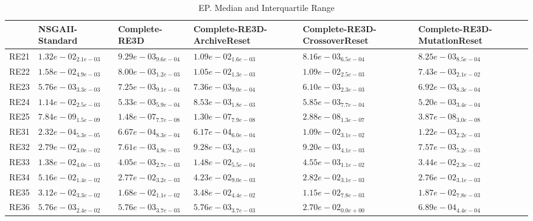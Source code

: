\documentclass{article}
\begin{document}
\begin{table}
\caption{EP. Median and Interquartile Range}
\label{table: EP}
\centering
\begin{scriptsize}
\begin{tabular}{llllll}
\hline & NSGAII-Standard & Complete-RE3D & Complete-RE3D-ArchiveReset & Complete-RE3D-CrossoverReset &  Complete-RE3D-MutationReset\\
\hline 
RE21 & $  1.32e-02_{ 2.1e-03}$ & $  9.29e-03_{ 9.6e-04}$ & $  1.09e-02_{ 1.6e-03}$ & \cellcolor{gray95}$  8.16e-03_{ 6.5e-04}$ & \cellcolor{gray25}$  8.25e-03_{ 8.5e-04}$ \\
RE22 & $  1.58e-02_{ 4.9e-03}$ & \cellcolor{gray25}$  8.00e-03_{ 1.2e-03}$ & $  1.05e-02_{ 1.3e-03}$ & $  1.09e-02_{ 2.5e-03}$ & \cellcolor{gray95}$  7.43e-03_{ 2.1e-02}$ \\
RE23 & \cellcolor{gray95}$  5.76e-03_{ 3.3e-03}$ & $  7.25e-03_{ 9.1e-04}$ & $  7.36e-03_{ 9.0e-04}$ & \cellcolor{gray25}$  6.10e-03_{ 2.3e-03}$ & $  6.92e-03_{ 8.3e-04}$ \\
RE24 & $  1.14e-02_{ 2.5e-03}$ & \cellcolor{gray25}$  5.33e-03_{ 5.9e-04}$ & $  8.53e-03_{ 1.8e-03}$ & $  5.85e-03_{ 7.7e-04}$ & \cellcolor{gray95}$  5.20e-03_{ 3.4e-04}$ \\
RE25 & \cellcolor{gray95}$  7.84e-09_{ 1.5e-09}$ & $  1.48e-07_{ 7.7e-08}$ & $  1.30e-07_{ 7.9e-08}$ & \cellcolor{gray25}$  2.88e-08_{ 1.3e-07}$ & $  3.87e-08_{ 3.0e-08}$ \\
RE31 & \cellcolor{gray95}$  2.32e-04_{ 5.3e-05}$ & $  6.67e-04_{ 8.3e-04}$ & \cellcolor{gray25}$  6.17e-04_{ 6.0e-04}$ & $  1.09e-02_{ 3.1e-02}$ & $  1.22e-03_{ 2.2e-03}$ \\
RE32 & $  2.79e-02_{ 3.0e-02}$ & \cellcolor{gray25}$  7.61e-03_{ 4.9e-03}$ & $  9.28e-03_{ 4.2e-03}$ & $  9.20e-03_{ 4.1e-03}$ & \cellcolor{gray95}$  7.57e-03_{ 5.2e-03}$ \\
RE33 & $  1.38e-02_{ 4.0e-03}$ & \cellcolor{gray95}$  4.05e-03_{ 2.7e-03}$ & $  1.48e-02_{ 5.5e-04}$ & \cellcolor{gray25}$  4.55e-03_{ 1.1e-02}$ & $  3.44e-02_{ 2.3e-02}$ \\
RE34 & $  5.16e-02_{ 1.4e-02}$ & \cellcolor{gray25}$  2.77e-02_{ 3.2e-03}$ & $  4.23e-02_{ 9.0e-03}$ & $  2.82e-02_{ 3.1e-03}$ & \cellcolor{gray95}$  2.76e-02_{ 3.1e-03}$ \\
RE35 & $  3.12e-02_{ 3.3e-02}$ & \cellcolor{gray25}$  1.68e-02_{ 1.1e-02}$ & $  3.48e-02_{ 4.4e-02}$ & \cellcolor{gray95}$  1.15e-02_{ 7.8e-03}$ & $  1.87e-02_{ 7.8e-03}$ \\
RE36 & $  5.76e-03_{ 2.4e-02}$ & \cellcolor{gray25}$  5.76e-03_{ 3.7e-03}$ & $  5.76e-03_{ 3.7e-03}$ & $  2.70e-02_{ 0.0e+00}$ & \cellcolor{gray95}$  6.89e-04_{ 4.4e-04}$ \\

\end{tabular}
\end{scriptsize}
\end{table}
\end{document}
